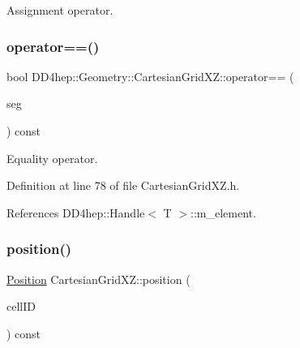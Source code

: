 Assignment operator. 

\hypertarget{class_d_d4hep_1_1_geometry_1_1_cartesian_grid_x_z_ab1d668dd19cd3c4f608b79fb945b3e55}{}\label{class_d_d4hep_1_1_geometry_1_1_cartesian_grid_x_z_ab1d668dd19cd3c4f608b79fb945b3e55} 
\subsubsection{\texorpdfstring{operator==()}{operator==()}}
{\footnotesize\ttfamily bool D\+D4hep\+::\+Geometry\+::\+Cartesian\+Grid\+X\+Z\+::operator== (\begin{DoxyParamCaption}\item[{const \hyperlink{class_d_d4hep_1_1_geometry_1_1_cartesian_grid_x_z}{Cartesian\+Grid\+XZ} \&}]{seg }\end{DoxyParamCaption}) const\hspace{0.3cm}{\ttfamily [inline]}}



Equality operator. 



Definition at line 78 of file Cartesian\+Grid\+X\+Z.\+h.



References D\+D4hep\+::\+Handle$<$ T $>$\+::m\+\_\+element.

\hypertarget{class_d_d4hep_1_1_geometry_1_1_cartesian_grid_x_z_a5a5fcdf64dbdb7ad2adc042f7e07158c}{}\label{class_d_d4hep_1_1_geometry_1_1_cartesian_grid_x_z_a5a5fcdf64dbdb7ad2adc042f7e07158c} 
\subsubsection{\texorpdfstring{position()}{position()}}
{\footnotesize\ttfamily \hyperlink{namespace_d_d4hep_1_1_geometry_a55083902099d03506c6db01b80404900}{Position} Cartesian\+Grid\+X\+Z\+::position (\begin{DoxyParamCaption}\item[{const Cell\+ID \&}]{cell\+ID }\end{DoxyParamCaption}) const}



